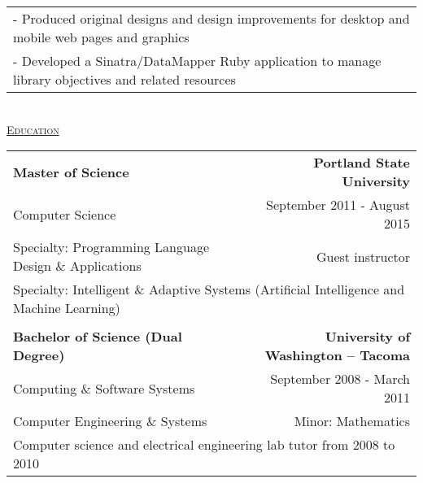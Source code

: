 \documentclass[letterpaper]{article}
\begin{document}
\begin{center}
\begin{tabular}{p{}p{}r}
				\multicolumn{3}{p{\textwidth}}{\quad\quad - Produced original designs and design improvements for desktop and mobile web pages and graphics} 
			\\
				\multicolumn{3}{p{\textwidth}}{\quad\quad - Developed a Sinatra/DataMapper Ruby application to manage library objectives and related resources} 
		\end{tabular} \\
		\vspace{0.25in} %
		\underline{\large \scshape Education}
		\begin{tabular}{p{}r}
				\textbf{Master of Science}							&
				\textbf{Portland State University \quad}
			\\
				\quad Computer Science\quad				&
				{September 2011 - August 2015 \quad\quad}
			\\
				\quad Specialty: Programming Language Design \& Applications		&		{Guest instructor \quad\quad}
			\\	
				\multicolumn{2}{p{\textwidth}}{\quad Specialty: Intelligent \& Adaptive Systems (Artificial Intelligence and Machine Learning)}
				
			\\
			\\
				\textbf{Bachelor of Science (Dual Degree)}			&
				\textbf{University of Washington -- Tacoma \quad}
			\\
				{\quad Computing \& Software Systems}						&
				{September 2008 - March 2011 \quad\quad}
			\\
				{\quad Computer Engineering \& Systems}						&
				{Minor: Mathematics \quad\quad}
			\\
				\multicolumn{2}{p{\textwidth}}{\quad Computer science and electrical engineering lab tutor from 2008 to 2010}	
				

\end{tabular}
\end{center}
\end{document}
